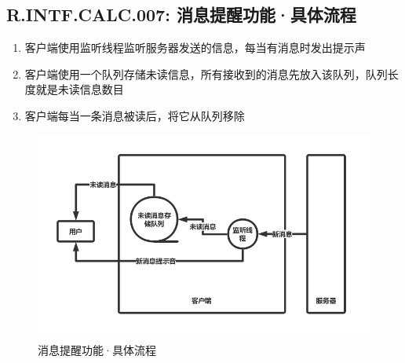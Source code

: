     \subsection{R.INTF.CALC.007: 消息提醒功能·具体流程}
    \begin{enumerate}
        \item 客户端使用监听线程监听服务器发送的信息，每当有消息时发出提示声
        \item 客户端使用一个队列存储未读信息，所有接收到的消息先放入该队列，队列长度就是未读信息数目
        \item 客户端每当一条消息被读后，将它从队列移除
    \end{enumerate}
    \newpage
        \begin{figure}[h]
            \centering
            \includegraphics[scale=0.4]{OutlineDesign/figures/消息提醒功能·具体流程.png}
            \caption{消息提醒功能·具体流程}
            \label{fig:server_flow}
        \end{figure}
